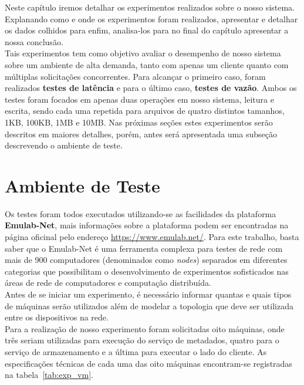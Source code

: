 	Neste capítulo iremos detalhar os experimentos realizados sobre o nosso sistema. Explanando como e onde os experimentos foram realizados, apresentar e detalhar os dados colhidos para enfim, analisa-los para no final do capítulo apresentar a nossa conclusão.
	\\
	
	Tais experimentos tem como objetivo avaliar o desempenho de nosso sistema sobre um ambiente de alta demanda, tanto com apenas um cliente quanto com múltiplas solicitações concorrentes. Para alcançar o primeiro caso, foram realizados \textbf{testes de latência} e para o último caso, \textbf{testes de vazão}. Ambos os testes foram focados em apenas duas operações em nosso sistema, leitura e escrita, sendo cada uma repetida para arquivos de quatro distintos tamanhos, 1KB, 100KB, 1MB e 10MB. Nas próximas seções estes experimentos serão descritos em maiores detalhes, porém, antes será apresentada uma subseção descrevendo o ambiente de teste.
	\\
	
	\section{Ambiente de Teste}
	Os testes foram todos executados utilizando-se as facilidades da plataforma \textbf{Emulab-Net}, mais informações sobre a plataforma podem ser encontradas na página oficinal pelo endereço \href{https://www.emulab.net/}{https://www.emulab.net/}. Para este trabalho, basta saber que o Emulab-Net é uma ferramenta complexa para testes de rede com mais de 900 computadores (denominados como \textit{nodes}) separados em diferentes categorias que possibilitam o desenvolvimento de experimentos sofisticados nas áreas de rede de computadores e computação distribuída.
	\\
	
	Antes de se iniciar um experimento, é necessário informar quantas e quais tipos de máquinas serão utilizados além de modelar a topologia que deve ser utilizada entre os dispositivos na rede. 
	\\
	
	Para a realização de nosso experimento foram solicitadas oito máquinas, onde três seriam utilizadas para execução do serviço de metadados, quatro para o serviço de armazenamento e a última para executar o lado do cliente. As especificações técnicas de cada uma das oito máquinas encontram-se registradas na tabela~\ref{tab:exp_vm}.
	\\
	
